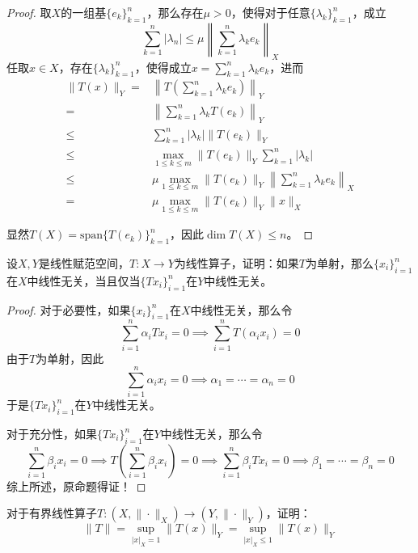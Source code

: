 \documentclass[lang = cn, scheme = chinese, 10pt]{elegantbook}
\begin{document}
\begin{proof}
	取$X$的一组基$\{ e_k \}_{k=1}^n$，那么存在$\mu>0$，使得对于任意$\{ \lambda_k \}_{k=1}^n$，成立
	$$
	\sum_{k=1}^{n}|\lambda_n|\le\mu\left\| \sum_{k=1}^n\lambda_k e_k \right\|_X
	$$
	任取$x\in X$，存在$\{ \lambda_k \}_{k=1}^n$，使得成立$\displaystyle x=\sum_{k=1}^{n}\lambda_k e_k$，进而
	\nonumber\begin{align}
		\|T(x)\|_Y
		=&\left\| T\left(\sum_{k=1}^{n}\lambda_k e_k\right) \right\|_Y\\
		=&\left\| \sum_{k=1}^{n}\lambda_kT\left( e_k\right) \right\|_Y\\
		\le&\sum_{k=1}^{n}|\lambda_k|\| T(e_k) \|_Y\\
		\le&\max_{1\le k\le m}\| T(e_k) \|_Y\sum_{k=1}^{n}|\lambda_k|\\
		\le&\mu\max_{1\le k\le m}\| T(e_k) \|_Y\left\| \sum_{k=1}^n\lambda_k e_k \right\|_X\\
		=&\mu\max_{1\le k\le m}\| T(e_k) \|_Y \|x\|_X
	\end{align}
	
	显然$T(X)=\mathrm{span}\{T(e_k)\}_{k=1}^{n}$，因此$\dim T(X)\le n$。
	
\end{proof}

\begin{proposition}
	设$X,Y$是线性赋范空间，$T:X\to Y$为线性算子，证明：如果$T$为单射，那么$\{x_i\}_{i=1}^{n}$在$X$中线性无关，当且仅当$\{Tx_i\}_{i=1}^{n}$在$Y$中线性无关。
\end{proposition}

\begin{proof}
	对于必要性，如果$\{x_i\}_{i=1}^{n}$在$X$中线性无关，那么令
	$$
	\sum_{i=1}^{n}\alpha_i Tx_i=0\implies \sum_{i=1}^{n}T(\alpha_ix_i)=0
	$$
	由于$T$为单射，因此
	$$
	\sum_{i=1}^{n}\alpha_ix_i=0\implies \alpha_1=\cdots=\alpha_n=0
	$$
	于是$\{Tx_i\}_{i=1}^{n}$在$Y$中线性无关。
	
	对于充分性，如果$\{Tx_i\}_{i=1}^{n}$在$Y$中线性无关，那么令
	$$
	\sum_{i=1}^{n}\beta_ix_i=0\implies T\left(\sum_{i=1}^{n}\beta_ix_i\right)=0\implies\sum_{i=1}^{n}\beta_i Tx_i=0 \implies \beta_1=\cdots=\beta_n=0
	$$
	综上所述，原命题得证！
\end{proof}

\begin{proposition}
	对于有界线性算子$T:(X,\|\cdot\|_X)\to (Y,\|\cdot\|_Y)$，证明：
	$$
	\| T \|=\sup_{|x|_X=1}\|T(x)\|_Y=\sup_{|x|_X\le 1}\|T(x)\|_Y
	$$
\end{proposition}
\end{document}
